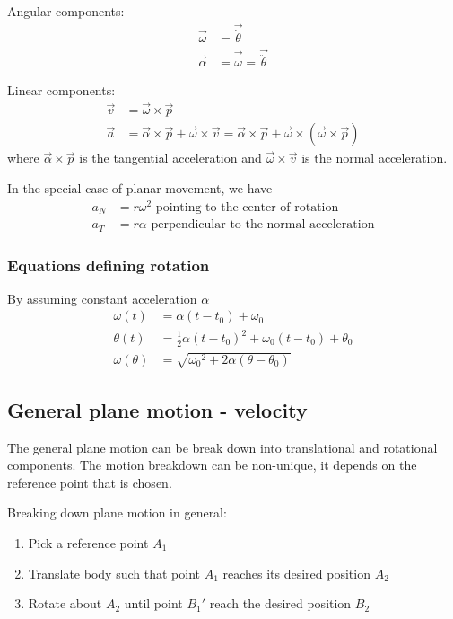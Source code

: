 \documentclass[10pt, twocolumn]{article}
\begin{document}
Angular components:
\begin{align*}
  \vec{\omega} & = \vec{\dot{\theta}}                       \\
  \vec{\alpha} & = \vec{\dot{\omega}} = \vec{\ddot{\theta}}
\end{align*}

Linear components:
\begin{align*}
  \vec{v} & = \vec{\omega} \times \vec{p}                                                                                                                              \\
  \vec{a} & = \vec{\alpha} \times \vec{p} + \vec{\omega} \times \vec{v} = \vec{\alpha} \times \vec{p} + \vec{\omega} \times \left( \vec{\omega} \times \vec{p} \right)
\end{align*}
where \(\vec{\alpha} \times \vec{p}\) is the tangential acceleration and \(\vec{\omega} \times \vec{v}\) is the normal acceleration.

In the special case of planar movement, we have
\begin{align*}
  a_N & = r\omega^2 \text{ pointing to the center of rotation}     \\
  a_T & = r\alpha \text{ perpendicular to the normal acceleration}
\end{align*}


\subsubsection{Equations defining rotation}
By assuming constant acceleration \(\alpha\)
\begin{align*}
  \omega(t)      & = \alpha (t - t_0) + \omega_0                                   \\
  \theta(t)      & = \frac{1}{2} \alpha (t - t_0)^2 + \omega_0(t - t_0) + \theta_0 \\
  \omega(\theta) & = \sqrt{{\omega_0}^2 + 2\alpha(\theta - \theta_0)}
\end{align*}


\subsection{General plane motion - velocity}
The general plane motion can be break down into translational and rotational components.
The motion breakdown can be non-unique, it depends on the reference point that is chosen.

Breaking down plane motion in general:
\begin{enumerate}
  \item Pick a reference point \(A_1\)
  \item Translate body such that point \(A_1\) reaches its desired position \(A_2\)
  \item Rotate about \(A_2\) until point \(B_1'\) reach the desired position \(B_2\)
\end{enumerate}
\end{document}
